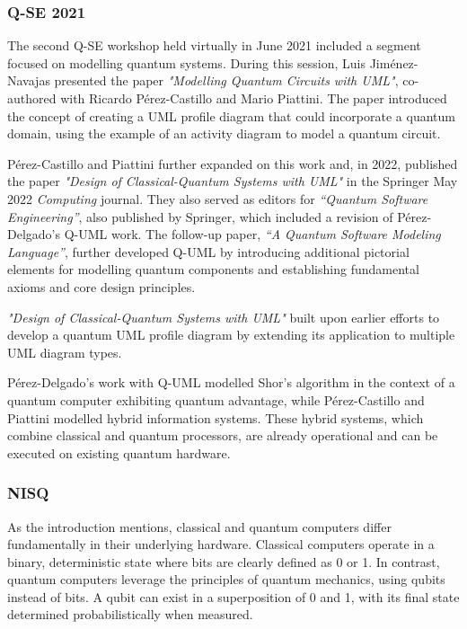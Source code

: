 \documentclass{article}
\begin{document}
{\subsubsection{Q-SE 2021}

The second Q-SE workshop held virtually in June 2021 included a segment focused on modelling quantum systems\cite{QSE2021}. During this session, Luis Jiménez-Navajas presented the paper \textit{"Modelling Quantum Circuits with UML"}\cite{Pérez-Castillo2021}, co-authored with Ricardo Pérez-Castillo and Mario Piattini. The paper introduced the concept of creating a UML profile diagram that could incorporate a quantum domain, using the example of an activity diagram to model a quantum circuit\cite{Pérez-Castillo2021}. 

Pérez-Castillo and Piattini further expanded on this work and, in 2022, published the paper \textit{"Design of Classical-Quantum Systems with UML"}\cite{Pérez-Castillo2022} in the Springer May 2022 \textit{Computing} journal\cite{Computing2022}. They also served as editors for \textit{“Quantum Software Engineering”}\cite{serrano2022quantum}, also published by Springer, which included a revision of Pérez-Delgado's Q-UML work. The follow-up paper, \textit{“A Quantum Software Modeling Language”}\cite{Pérez-Delgado2022}, further developed Q-UML by introducing additional pictorial elements for modelling quantum components and establishing fundamental axioms and core design principles.

\textit{"Design of Classical-Quantum Systems with UML"}\cite{Pérez-Castillo2022} built upon earlier efforts to develop a quantum UML profile diagram by extending its application to multiple UML diagram types. 

Pérez-Delgado's work with Q-UML modelled Shor's algorithm in the context of a quantum computer exhibiting quantum advantage, while Pérez-Castillo and Piattini modelled hybrid information systems. These hybrid systems, which combine classical and quantum processors, are already operational and can be executed on existing quantum hardware.

\subsubsection{NISQ}

As the introduction mentions, classical and quantum computers differ fundamentally in their underlying hardware. Classical computers operate in a binary, deterministic state where bits are clearly defined as 0 or 1. In contrast, quantum computers leverage the principles of quantum mechanics, using qubits instead of bits. A qubit can exist in a superposition of 0 and 1, with its final state determined probabilistically when measured. 

}
\end{document}
